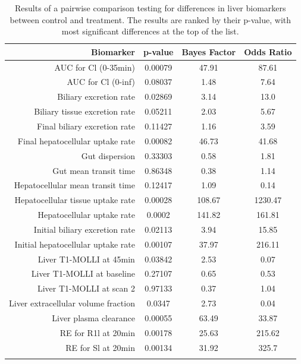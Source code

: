 \documentclass{epflreport}%
\begin{document}
%
\begin{longtable}{rccc}%
\hline%
Biomarker&p{-}value&Bayes Factor&Odds Ratio\\%
\hline%
AUC for Cl (0{-}35min)&0.00079&47.91&87.61\\%
AUC for Cl (0{-}inf)&0.08037&1.48&7.64\\%
Biliary excretion rate&0.02869&3.14&13.0\\%
Biliary tissue excretion rate&0.05211&2.03&5.67\\%
Final biliary excretion rate&0.11427&1.16&3.59\\%
Final hepatocellular uptake rate&0.00082&46.73&41.68\\%
Gut dispersion&0.33303&0.58&1.81\\%
Gut mean transit time&0.86348&0.38&1.14\\%
Hepatocellular mean transit time&0.12417&1.09&0.14\\%
Hepatocellular tissue uptake rate&0.00028&108.67&1230.47\\%
Hepatocellular uptake rate&0.0002&141.82&161.81\\%
Initial biliary excretion rate&0.02113&3.94&15.85\\%
Initial hepatocellular uptake rate&0.00107&37.97&216.11\\%
Liver T1{-}MOLLI at 45min&0.03842&2.53&0.07\\%
Liver T1{-}MOLLI at baseline&0.27107&0.65&0.53\\%
Liver T1{-}MOLLI at scan 2&0.97133&0.37&1.04\\%
Liver extracellular volume fraction&0.0347&2.73&0.04\\%
Liver plasma clearance&0.00055&63.49&33.87\\%
RE for R1l at 20min&0.00178&25.63&215.62\\%
RE for Sl at 20min&0.00134&31.92&325.7\\%
\hline%
\caption{Results of a pairwise comparison testing for differences in liver biomarkers between control and treatment. The results are ranked by their p-value, with most significant differences at the top of the list.} \\%
\end{longtable}%
\end{document}
